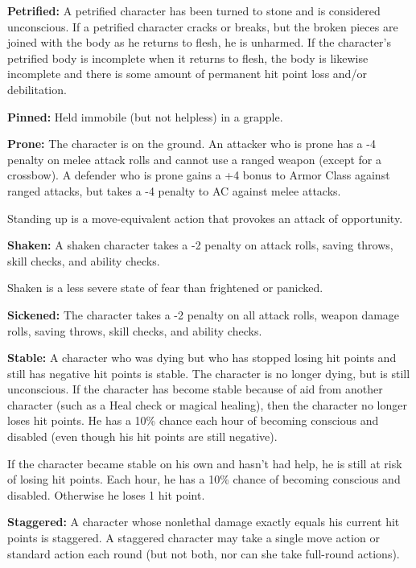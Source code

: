 \documentclass{article}
\begin{document}
\vspace{12pt}
\textbf{Petrified:} A petrified character has been turned to stone and is considered 
unconscious. If a petrified character cracks or breaks, but the broken pieces are 
joined with the body as he returns to flesh, he is unharmed. If the character's 
petrified body is incomplete when it returns to flesh, the body is likewise incomplete 
and there is some amount of permanent hit point loss and/or debilitation.

\vspace{12pt}
\textbf{Pinned:} Held immobile (but not helpless) in a grapple.

\vspace{12pt}
\textbf{Prone:} The character is on the ground. An attacker who is prone has a 
-4 penalty on melee attack rolls and cannot use a ranged weapon (except for a crossbow). 
A defender who is prone gains a +4 bonus to Armor Class against ranged attacks, 
but takes a -4 penalty to AC against melee attacks.

Standing up is a move-equivalent action that provokes an attack of opportunity.

\vspace{12pt}
\textbf{Shaken: }A shaken character takes a -2 penalty on attack rolls, saving 
throws, skill checks, and ability checks.

Shaken is a less severe state of fear than frightened or panicked.

\vspace{12pt}
\textbf{Sickened:} The character takes a -2 penalty on all attack rolls, weapon 
damage rolls, saving throws, skill checks, and ability checks.

\vspace{12pt}
\textbf{Stable:} A character who was dying but who has stopped losing hit points 
and still has negative hit points is stable. The character is no longer dying, 
but is still unconscious. If the character has become stable because of aid from 
another character (such as a Heal check or magical healing), then the character 
no longer loses hit points. He has a 10\% chance each hour of becoming conscious 
and disabled (even though his hit points are still negative). 

If the character became stable on his own and hasn't had help, he is still at risk 
of losing hit points. Each hour, he has a 10\% chance of becoming conscious and 
disabled. Otherwise he loses 1 hit point.

\vspace{12pt}
\textbf{Staggered:} A character whose nonlethal damage exactly equals his current 
hit points is staggered. A staggered character may take a single move action or 
standard action each round (but not both, nor can she take full-round actions).
\end{document}
